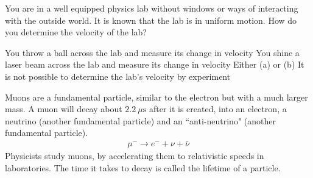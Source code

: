 \documentclass[12pt]{exam}
\begin{document}
\begin{questions}
\question You are in a well equipped physics lab without windows or ways of interacting with the outside world. It is
known that the lab is in uniform motion. How do you determine the velocity of the lab?
\begin{choices}
	\choice You throw a ball across the lab and measure its change in velocity
	\choice You shine a laser beam across the lab and measure its change in velocity
	\choice Either (a) or (b)
	\choice It is not possible to determine the lab’s velocity by experiment
\end{choices}
\question Muons are a fundamental particle, similar to the electron but with a much larger mass. A muon will decay about $2.2~\mu\text{s}$ after it is created, into an electron, a neutrino (another fundamental particle) and an ``anti-neutrino" (another fundamental particle).
\begin{eqnarray}
\mu^- \rightarrow e^- + \nu + \bar{\nu} \nonumber
\end{eqnarray}
Physicists study muons, by accelerating them to relativistic speeds in laboratories. The time it takes to decay is called the lifetime of a particle.

\end{questions}
\end{document}
